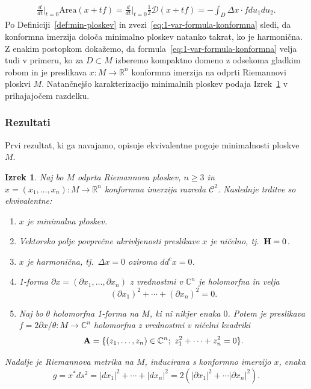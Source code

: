 \documentclass[12pt,a4paper,twoside]{article}
\theoremstyle{definition} %
\theoremstyle{plain} %
\newtheorem{izrek}[definicija]{Izrek}
\numberwithin{equation}{section}  %
\newcommand{\R}{\mathbb R}
\newcommand{\C}{\mathbb C}
\begin{document}
\begin{gather} \label{eq:1-var-formula-konformna}
\frac{d}{dt} \Big|_{t=0} \text{Area}(x+tf) = \frac{d}{dt} \Big|_{t=0} \frac{1}{2} \mathcal{D}(x+tf) = - \int_{D} \Delta{x} \cdot f du_1 du_2.
\end{gather}
Po Definiciji~\ref{def:min-ploskev} in zvezi~\eqref{eq:1-var-formula-konformna} sledi, da konformna imerzija določa minimalno ploskev natanko takrat, ko je harmonična. 
Z enakim postopkom dokažemo, da formula~\eqref{eq:1-var-formula-konformna} velja tudi v primeru, ko za $D \subset M$ izberemo kompaktno domeno z odsekoma gladkim robom in je preslikava $x \colon M \to \R^{n}$ konformna imerzija na odprti Riemannovi ploskvi $M$.
Natančnejšo karakterizacijo minimalnih ploskev podaja Izrek~\ref{izr:ekviv-min-ploskev} v prihajajočem razdelku.

\subsubsection{Rezultati}
%
Prvi rezultat, ki ga navajamo, opisuje ekvivalentne pogoje minimalnosti ploskve $M$.

\begin{izrek} \label{izr:ekviv-min-ploskev}
Naj bo $M$ odprta Riemannova ploskev, $n \geq 3$ in $x = (x_1, \dots , x_n) \colon M \to \R^{n}$ konformna imerzija razreda $\mathcal{C}^2$. Naslednje trditve so ekvivalentne:
\begin{enumerate}
	\item $x$ je minimalna ploskev.
	\item Vektorsko polje povprečne ukrivljenosti preslikave $x$ je ničelno, tj.~$\textbf{\textup{H}} = 0$.
	\item $x$ je harmonična, tj.~$\Delta{x} = 0$ oziroma $dd^{c}x = 0$.
	\item 1-forma $ \partial{x} = (\partial{x_1}, \dots , \partial{x_n})$ z vrednostmi v $\C^{n}$ je holomorfna in velja
			\begin{equation} \label{eq:partialx^2 = 0}
			(\partial{x_1})^2 + \cdots + (\partial{x_n})^2 = 0.
			\end{equation}
	\item Naj bo $\theta$ holomorfna 1-forma na $M$, ki ni nikjer enaka $0$. Potem je preslikava $f = 2\partial{x} / \theta \colon M \to \C^{n}$ holomorfna z 				vrednostmi v ničelni kvadriki
			\begin{equation} \label{ničelna-kvadrika}		
			\textbf{\textup{A}} = \{ (z_1, \dots , z_n) \in \C^{n} ; \ z_{1}^{2} + \cdots + z_{n}^{2} = 0 \}.
			\end{equation}	
\end{enumerate}
Nadalje je Riemannova metrika na $M$, inducirana s konformno imerzijo $x$, enaka
	\begin{equation} \label{eq:|dx|^2=2|partialx|^2}
	g = x^{*} ds^2 = |dx_1|^2 + \cdots + |dx_n|^2 = 2 (|\partial{x_1}|^2 + \cdots |\partial{x_n}|^2).
	\end{equation}			
\end{izrek}
\end{document}
